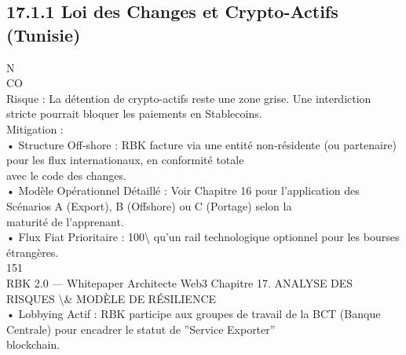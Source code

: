 \subsection{17.1.1 Loi des Changes et Crypto-Actifs (Tunisie)}
N\\
CO\\
Risque : La détention de crypto-actifs reste une zone grise. Une interdiction stricte pourrait bloquer les paiements en Stablecoins.\\
Mitigation :\\
\vspace{0.5em}
• Structure Off-shore : RBK facture via une entité non-résidente (ou partenaire) pour les flux internationaux, en conformité totale\\
avec le code des changes.\\
\vspace{0.5em}
• Modèle Opérationnel Détaillé : Voir Chapitre 16 pour l’application des Scénarios A (Export), B (Offshore) ou C (Portage) selon la\\
maturité de l’apprenant.\\
\vspace{0.5em}
• Flux Fiat Prioritaire : 100\textbackslash{}%
qu’un rail technologique optionnel pour les bourses étrangères.\\
\vspace{0.5em}
\vspace{0.5em}
151\\
RBK 2.0 — Whitepaper Architecte Web3                                        Chapitre 17. ANALYSE DES RISQUES \textbackslash{}& MODÈLE DE RÉSILIENCE\\
\vspace{0.5em}
\vspace{0.5em}
• Lobbying Actif : RBK participe aux groupes de travail de la BCT (Banque Centrale) pour encadrer le statut de ”Service Exporter”\\
blockchain.\\
\vspace{0.5em}
\vspace{0.5em}

